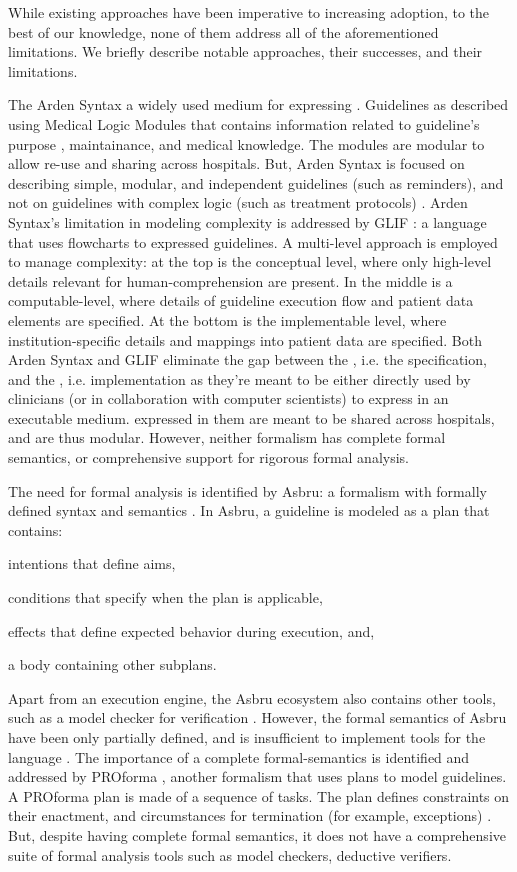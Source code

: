 While existing approaches have been imperative to increasing \CGS{} adoption, to the
best of our knowledge, none of them address all of the aforementioned
limitations. We briefly describe notable approaches, their successes, and their limitations.

The Arden Syntax \cite{HripcsakCBM94} a widely used medium for
expressing \CIGs{}.  Guidelines as described using Medical
Logic Modules that contains information related to guideline's purpose
, maintainance, and medical knowledge. The modules are modular to allow
re-use and sharing across hospitals. But, Arden Syntax
is focused on describing simple, modular, and independent
guidelines (such as reminders), and not on guidelines with complex logic (such
as treatment protocols) \cite{PelegJBI01}.
Arden Syntax's limitation in modeling complexity is addressed by
GLIF \cite{BoxwalaJBI04}: a language that uses flowcharts to expressed
guidelines. A multi-level approach is
employed to manage complexity: at the top is the conceptual level, where
only high-level details relevant for human-comprehension are present. In the
middle is a computable-level, where details of guideline execution flow
and patient data elements are specified. At the bottom is the implementable
level, where institution-specific details and mappings into patient data are
specified. Both Arden Syntax and GLIF  eliminate
the gap between the \BPG{}, i.e. the specification, and the \CIG{}, i.e. implementation as
they're meant to be either directly used by clinicians (or in collaboration with
computer scientists) to express \BPGs{} in an executable medium. \CIGs{}
expressed in them are meant to be shared across hospitals, and are thus modular.
However, neither formalism has complete formal semantics, or comprehensive support for
rigorous formal analysis.

The need for formal analysis is identified by Asbru: a formalism with formally
defined syntax and semantics \cite{ShaharAMIA96}. In Asbru, a guideline is modeled as a plan
that contains:
\begin{enumerate*}[label=(\roman*)]
  \item intentions that define aims,
  \item conditions that specify when the plan is applicable,
  \item effects that define expected behavior during execution, and,
  \item a body containing other subplans.
\end{enumerate*}
Apart from an execution engine, the Asbru ecosystem also contains
other tools, such as a model checker for verification \cite{BaumlerSPIN06}.
However, the formal semantics of Asbru have been only partially defined, and
is insufficient to implement tools for the language \cite{SuttonAMIA03}.
The importance of a complete formal-semantics is identified and addressed
by PROforma \cite{SuttonAMIA03}, another formalism that uses plans to
model guidelines. A PROforma plan is made of a sequence of tasks.
The plan defines constraints on their enactment, and circumstances
for termination (for example, exceptions) \cite{SuttonAMIA03}. But, despite
having complete formal semantics, it does not have a comprehensive suite of
formal analysis tools such as model checkers, deductive verifiers.

